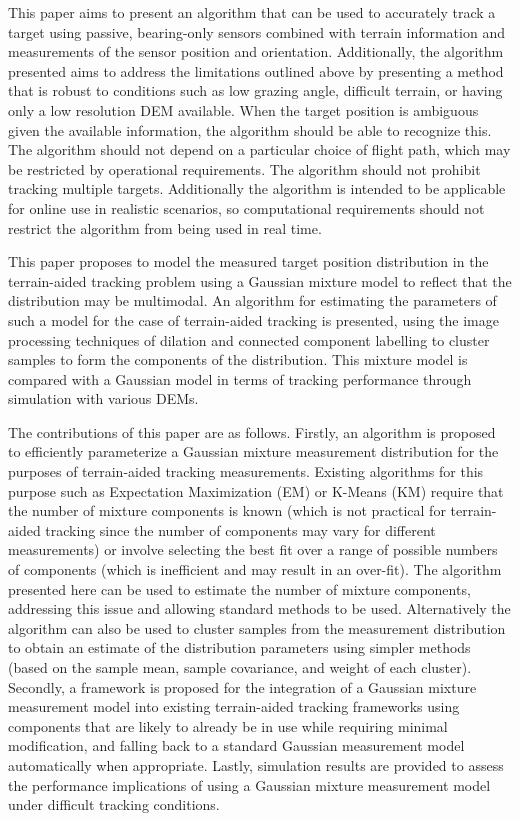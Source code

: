 \documentclass[journal]{IEEEtran}
\begin{document}
This paper aims to present an algorithm that can be used to accurately track a target using passive, bearing-only sensors combined with terrain information and measurements of the sensor position and orientation. Additionally, the algorithm presented aims to address the limitations outlined above by presenting a method that is robust to conditions such as low grazing angle, difficult terrain, or having only a low resolution DEM available. When the target position is ambiguous given the available information, the algorithm should be able to recognize this. The algorithm should not depend on a particular choice of flight path, which may be restricted by operational requirements. The algorithm should not prohibit tracking multiple targets. Additionally the algorithm is intended to be applicable for online use in realistic scenarios, so computational requirements should not restrict the algorithm from being used in real time.

This paper proposes to model the measured target position distribution in the terrain-aided tracking problem using a Gaussian mixture model to reflect that the distribution may be multimodal. An algorithm for estimating the parameters of such a model for the case of terrain-aided tracking is presented, using the image processing techniques of dilation and connected component labelling to cluster samples to form the components of the distribution. This mixture model is compared with a Gaussian model in terms of tracking performance through simulation with various DEMs.

The contributions of this paper are as follows. Firstly, an algorithm is proposed to efficiently parameterize a Gaussian mixture measurement distribution for the purposes of terrain-aided tracking measurements. Existing algorithms for this purpose such as Expectation Maximization (EM) or K-Means (KM) require that the number of mixture components is known (which is not practical for terrain-aided tracking since the number of components may vary for different measurements) or involve selecting the best fit over a range of possible numbers of components (which is inefficient and may result in an over-fit). The algorithm presented here can be used to estimate the number of mixture components, addressing this issue and allowing standard methods to be used. Alternatively the algorithm can also be used to cluster samples from the measurement distribution to obtain an estimate of the distribution parameters using simpler methods (based on the sample mean, sample covariance, and weight of each cluster). Secondly, a framework is proposed for the integration of a Gaussian mixture measurement model into existing terrain-aided tracking frameworks using components that are likely to already be in use while requiring minimal modification, and falling back to a standard Gaussian measurement model automatically when appropriate. Lastly, simulation results are provided to assess the performance implications of using a Gaussian mixture measurement model under difficult tracking conditions.
\end{document}
